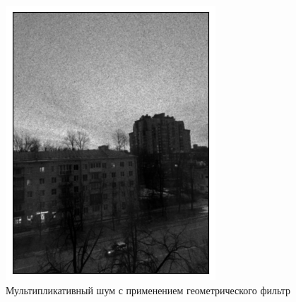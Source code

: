 \documentclass[a4paper,12pt]{article}
\begin{document}
\begin{figure}[H]
    \begin{minipage}{0.49\textwidth}
        \centering \includegraphics[width=\textwidth]{results/lpf_speckle_2.png}
        \caption{Мультипликативный шум с применением геометрического фильтр}
    \end{minipage}
\end{figure}
\end{document}
